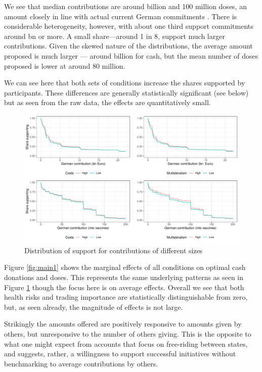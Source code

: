 \documentclass[12pt,oneside]{article}
\begin{document}
We see that median contributions are around  billion and 100 million doses,  an amount closely in line with actual current German commitments%
. There is considerable heterogeneity, however, with about one third support commitments around  bn or more. A small share---around 1 in 8, support much larger contributions. Given the skewed nature of the distributions, the average amount proposed is much larger --- around   billion for cash, but the mean number of doses proposed is lower at around 80 million. 




We can see here that both sets of conditions increase the shares supported by participants. These differences are generally statistically significant (see below) but as seen from the raw data, the effects are quantitatively small. 

\begin{figure}[hbt!]
	\includegraphics[width=\linewidth]{"../2_output/cumulative.pdf"}
	\caption{Distribution of support for contributions of different sizes}
	\label{fig:hist1}
\end{figure}

Figure \ref{fig:main1} shows the marginal effects of all conditions on optimal cash donations and doses. This represents the same underlying patterns as seen in Figure \ref{fig:hist1} though the focus here is on average effects. Overall we see that both health risks and trading importance are statistically distinguishable from zero, but, as seen already, the magnitude of effects is not large. 

Strikingly the amounts offered are positively responsive to amounts given by others, but unresponsive to the number of others giving. This is the opposite to what one might expect from accounts that focus on free-riding between states, and suggests, rather, a willingness to support successful initiatives without benchmarking to average contributions by others. 
  
\end{document}
